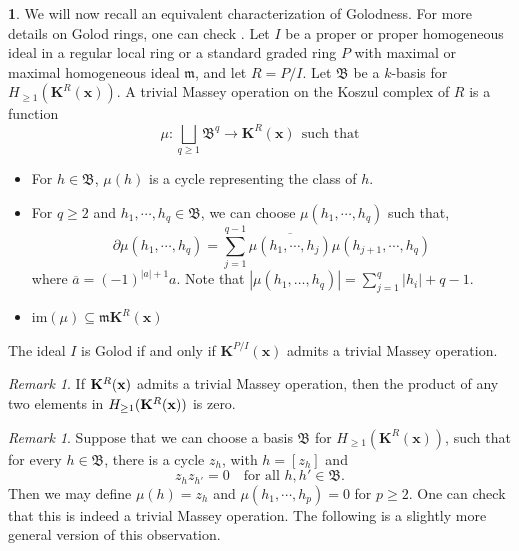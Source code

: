 \documentclass[10pt,reqno]{amsart}
\theoremstyle{definition}
\newtheorem{chunk}[subsection]{}
\theoremstyle{remark}
\newtheorem{remark}[subsection]{Remark}
\numberwithin{equation}{section}
\newcommand{\m}{\mathfrak m}
\numberwithin{equation}{section}
\begin{document}
\begin{chunk} We will now recall an equivalent characterization of Golodness. For more details on Golod rings, one can check \cite{avramov1998infinite}.
 Let $I$ be a proper or proper homogeneous ideal in a regular local ring or a standard graded ring $P$ with maximal or maximal homogeneous ideal $\m$, and let $R=P/I$. Let $\mathfrak B$ be a $k$-basis for $H_{\geq 1}(\mathbf{K}^{R}(\mathbf{x}))$. A trivial Massey operation on the Koszul complex of $R$ is a function \[
     \mu:\bigsqcup _{q\geq 1} \mathfrak B^q\xrightarrow[]{}\mathbf{K}^{R}(\mathbf{x})  \ \ \text{such that}
     \]
\begin{itemize}
         \item[(i)] For $h\in \mathfrak B$, $\mu(h)$ is a cycle representing the class of $h$.
         \item[(ii)] For $q\geq 2$ and $h_1,\cdots,h_q\in \mathfrak B$, we can choose $\mu(h_1,\cdots,h_q)$ such that,
         \begin{equation}\label{massey}
         \partial \mu(h_1,\cdots,h_q)=\sum_{j=1}^{q-1}\overline{\mu(h_1,\cdots,h_{j})}\mu(h_{j+1},\cdots,h_q)
         \end{equation} 
         where $\overline{a}=(-1)^{|a|+1}a$.
         Note that $|\mu(h_1, \ldots, h_q)|=\sum_{j=1}^q |h_i|+q-1$.
         \item[(iii)] $\mathrm{im}(\mu)\subseteq \m \mathbf{K}^R(\mathbf{x})$
     \end{itemize}
 The ideal $I$ is Golod if and only if $\mathbf{K}^{P/I}(\mathbf{x})$ admits a trivial Massey operation.
 \begin{remark}\label{notGolodcondition}
 If $\mathbf{K}^R({\bf x})$ admits a trivial Massey operation, then the product of any two elements in $H_{\ge 1}({\bf K}^R({\bf x}))$ is zero.
 \end{remark}  
 \begin{remark}\label{zeroproduct} Suppose that we can choose a basis $\mathfrak B$ for $H_{\geq 1}(\mathbf{K}^{R}(\mathbf{x}))$, such that for every $h\in \mathfrak B$, there is a cycle $z_h$, with $h=[z_h]$ and \[z_hz_{h'}=0\quad\text{for all }h,h'\in \mathfrak B.
 \]Then we may define $\mu(h)=z_h$ and $\mu(h_1,\cdots,h_p)=0$ for $p\geq 2$. One can check that this is indeed a trivial Massey operation. The following is a slightly more general version of this observation.
 \end{remark}
\end{chunk}
\end{document}
